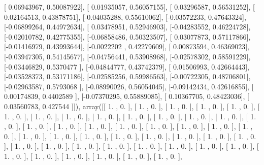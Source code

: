 \documentclass{article}
\begin{document}
       [ 0.06943967,  0.50087922],
       [ 0.01935057,  0.56057155],
       [ 0.03296587,  0.56531252],
       [ 0.02164513,  0.43878751],
       [-0.04035288,  0.55610062],
       [-0.03572233,  0.47643324],
       [-0.06899264,  0.44972634],
       [ 0.03478951,  0.52946903],
       [-0.04283552,  0.46224728],
       [-0.02010782,  0.42775355],
       [-0.06858486,  0.50323507],
       [ 0.03077873,  0.57117866],
       [-0.01416979,  0.43993644],
       [-0.0022202 ,  0.42279609],
       [ 0.00873594,  0.46369023],
       [-0.03947305,  0.54145677],
       [-0.04756441,  0.53908968],
       [-0.02578302,  0.58591229],
       [-0.03446829,  0.5370477 ],
       [-0.04844777,  0.43742379],
       [ 0.01506993,  0.42664443],
       [-0.03528373,  0.53171186],
       [-0.02585256,  0.59986563],
       [-0.00722305,  0.48706801],
       [-0.02963587,  0.5793068 ],
       [-0.08990026,  0.56054045],
       [-0.09142434,  0.42616855],
       [ 0.00174839,  0.4402589 ],
       [-0.07370295,  0.55889085],
       [ 0.10367705,  0.48423036],
       [ 0.03560783,  0.427544  ]]), array([[ 1.        ,  0.        ],
       [ 1.        ,  0.        ],
       [ 1.        ,  0.        ],
       [ 1.        ,  0.        ],
       [ 1.        ,  0.        ],
       [ 1.        ,  0.        ],
       [ 1.        ,  0.        ],
       [ 1.        ,  0.        ],
       [ 1.        ,  0.        ],
       [ 1.        ,  0.        ],
       [ 1.        ,  0.        ],
       [ 1.        ,  0.        ],
       [ 1.        ,  0.        ],
       [ 1.        ,  0.        ],
       [ 1.        ,  0.        ],
       [ 1.        ,  0.        ],
       [ 1.        ,  0.        ],
       [ 1.        ,  0.        ],
       [ 1.        ,  0.        ],
       [ 1.        ,  0.        ],
       [ 1.        ,  0.        ],
       [ 1.        ,  0.        ],
       [ 1.        ,  0.        ],
       [ 1.        ,  0.        ],
       [ 1.        ,  0.        ],
       [ 1.        ,  0.        ],
       [ 1.        ,  0.        ],
       [ 1.        ,  0.        ],
       [ 1.        ,  0.        ],
       [ 1.        ,  0.        ],
       [ 1.        ,  0.        ],
       [ 1.        ,  0.        ],
       [ 1.        ,  0.        ],
       [ 1.        ,  0.        ],
       [ 1.        ,  0.        ],
       [ 1.        ,  0.        ],
       [ 1.        ,  0.        ],
       [ 1.        ,  0.        ],
       [ 1.        ,  0.        ],
       [ 1.        ,  0.        ],
       [ 1.        ,  0.        ],
       [ 1.        ,  0.        ],
       [ 1.        ,  0.        ],
       [ 1.        ,  0.        ],
\end{document}
